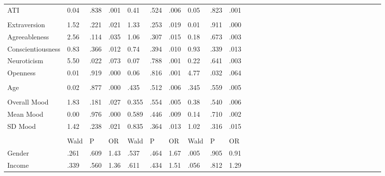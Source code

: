 \documentclass[authordate, empirical,issue]{jote-new-article}
\begin{document}
\begin{table}[t]
\begin{fullwidth}
\begin{tabular}{@{} l l l l l l l l l l l l l l l l l l l l l l l l l l l l l l @{}}
			 ATI & 0.04 & .838 & .001 & 0.41 & .524 & .006 & 0.05 & .823 & .001 \\

			  &  &  &  &  &  &  &  &  &  \\

			 Extraversion & 1.52 & .221 & .021 & 1.33 & .253 & .019 & 0.01 & .911 & .000
			\\

			 Agreeableness & 2.56 & .114 & .035 & 1.06 & .307 & .015 & 0.18 & .673 & .003
			\\

			 Conscientiousness & 0.83 & .366 & .012 & 0.74 & .394 & .010 & 0.93 & .339
			& .013 \\

			 Neuroticism & 5.50 & .022 & .073 & 0.07 & .788 & .001 & 0.22 & .641 & .003
			\\

			 Openness & 0.01 & .919 & .000 & 0.06 & .816 & .001 & 4.77 & .032 & .064 \\

			  &  &  &  &  &  &  &  &  &  \\

			 Age & 0.02 & .877 & .000 & .435 & .512 & .006 & .345 & .559 & .005 \\

			  &  &  &  &  &  &  &  &  &  \\

			 Overall Mood & 1.83 & .181 & .027 & 0.355 & .554 & .005 & 0.38 & .540 &
			.006 \\

			 Mean Mood & 0.00 & .976 & .000 & 0.589 & .446 & .009 & 0.14 & .710 & .002
			\\

			 SD Mood & 1.42 & .238 & .021 & 0.835 & .364 & .013 & 1.02 & .316 & .015
			\\

			  &  &  &  &  &  &  &  &  &  \\

			\hline  & Wald & P & OR & Wald & P & OR & Wald & P & OR \\

			\hline Gender & .261 & .609 & 1.43 & .537 & .464 & 1.67 & .005 & .905 & 0.91
			\\

			 Income & .339 & .560 & 1.36 & .611 & .434 & 1.51 & .056 & .812 & 1.29 \\


		\end{tabular}
	\end{fullwidth}
	\end{table}
\end{document}
